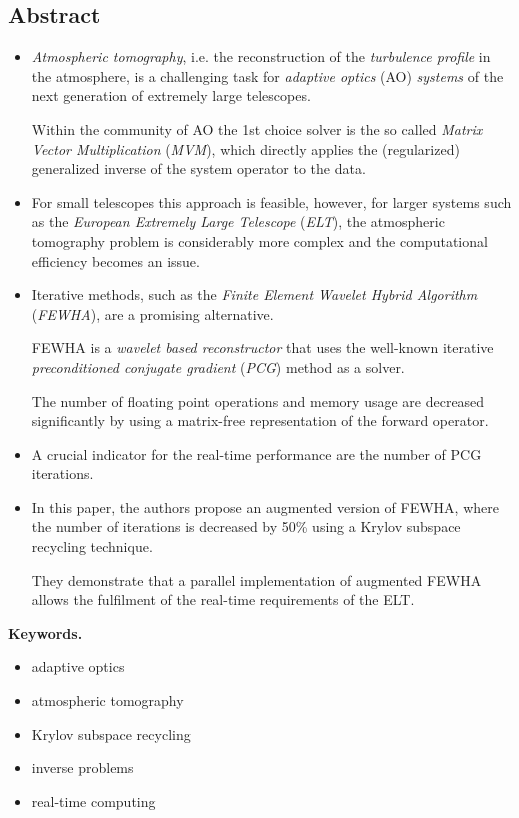\documentclass{book}
\numberwithin{equation}{section}
\begin{document}
\subsection*{Abstract}
\begin{itemize}
    \item \textit{Atmospheric tomography}, i.e. the reconstruction of the \textit{turbulence profile} in the atmosphere, is a challenging task for \textit{adaptive optics} (AO) \textit{systems} of the next generation of extremely large telescopes.
    
    Within the community of AO the 1st choice solver is the so called \textit{Matrix Vector Multiplication} (\textit{MVM}), which directly applies the (regularized) generalized inverse of the system operator to the data.
    \item  For small telescopes this approach is feasible, however, for larger systems such as the \textit{European Extremely Large Telescope} (\textit{ELT}), the atmospheric tomography problem is considerably more complex and the computational efficiency becomes an issue.    
    \item Iterative methods, such as the \textit{Finite Element Wavelet Hybrid Algorithm} (\textit{FEWHA}), are a promising alternative.
    
    FEWHA is a \textit{wavelet based reconstructor} that uses the well-known iterative \textit{preconditioned conjugate gradient} (\textit{PCG}) method as a solver.
    
    The number of floating point operations and memory usage are decreased significantly by using a matrix-free representation of the forward operator.    
    \item A crucial indicator for the real-time performance are the number of PCG iterations.    
    \item In this paper, the authors propose an augmented version of FEWHA, where the number of iterations is decreased by 50\% using a Krylov subspace recycling technique.
    
    They demonstrate that  a parallel implementation of augmented FEWHA allows the fulfilment of the real-time requirements of the ELT.
\end{itemize}
\textbf{Keywords.}
\begin{itemize}
    \item adaptive optics
    \item atmospheric tomography
    \item Krylov subspace recycling
    \item inverse problems
    \item real-time computing
\end{itemize}
\end{document}
